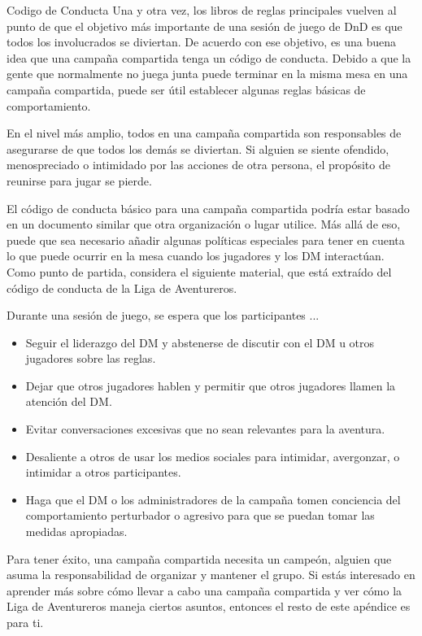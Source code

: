 \documentclass[a4paper,twocolumn,openany,10pt]{dndbook}
\begin{document}
\begin{paperbox}[float=!b]{Codigo de Conducta}
	Una y otra vez, los libros de reglas principales vuelven al punto de que el objetivo más importante de una sesión de juego
	de DnD es que todos los involucrados se diviertan. De acuerdo con ese objetivo, es una buena idea que una campaña compartida
	tenga un código de conducta. Debido a que la gente que normalmente no juega junta puede terminar en la misma mesa en una
	campaña compartida, puede ser útil establecer algunas reglas básicas de comportamiento.
	
	En el nivel más amplio, todos en una campaña compartida son responsables de asegurarse de que todos los demás se diviertan.
	Si alguien se siente ofendido, menospreciado o intimidado por las acciones de otra persona, el propósito de reunirse para
	jugar se pierde.
	
	El código de conducta básico para una campaña compartida podría estar basado en un documento similar que otra organización o
	lugar utilice. Más allá de eso, puede que sea necesario añadir algunas políticas especiales para tener en cuenta lo que
	puede ocurrir en la mesa cuando los jugadores y los DM interactúan. Como punto de partida, considera el siguiente material,
	que está extraído del código de conducta de la Liga de Aventureros.
	
	Durante una sesión de juego, se espera que los participantes ...
	\begin{itemize}
		\item Seguir el liderazgo del DM y abstenerse de discutir con el DM u otros jugadores sobre las reglas.
		\item Dejar que otros jugadores hablen y permitir que otros jugadores llamen la atención del DM.
		\item Evitar conversaciones excesivas que no sean relevantes para la aventura.
		\item Desaliente a otros de usar los medios sociales para intimidar, avergonzar, o intimidar a otros participantes.
		\item Haga que el DM o los administradores de la campaña tomen conciencia del comportamiento perturbador o agresivo para
		que se puedan tomar las medidas apropiadas. 
	\end{itemize}
\end{paperbox}

Para tener éxito, una campaña compartida necesita un campeón, alguien que asuma la responsabilidad de organizar y mantener el
grupo. Si estás interesado en aprender más sobre cómo llevar a cabo una campaña compartida y ver cómo la Liga de Aventureros
maneja ciertos asuntos, entonces el resto de este apéndice es para ti. 
\end{document}
